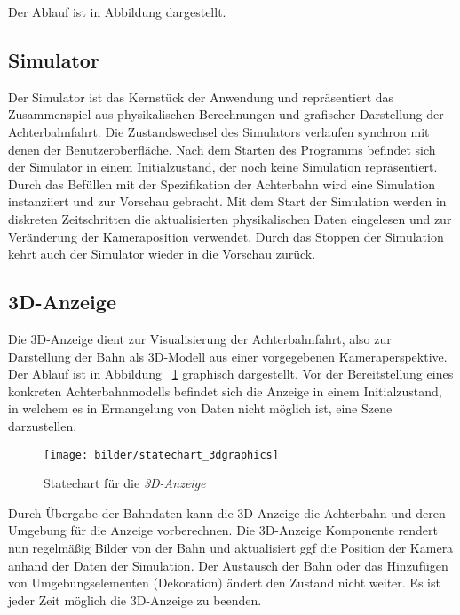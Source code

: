 Der Ablauf ist in Abbildung 
dargestellt.


\subsection{Simulator}
Der Simulator ist das Kernstück der Anwendung und repräsentiert das Zusammenspiel aus physikalischen Berechnungen
und grafischer Darstellung der Achterbahnfahrt. Die Zustandswechsel des Simulators verlaufen synchron mit 
denen der Benutzeroberfläche. Nach dem Starten des Programms befindet sich der Simulator in einem Initialzustand,
der noch keine Simulation repräsentiert. Durch das Befüllen mit der Spezifikation der Achterbahn wird
eine Simulation instanziiert und zur Vorschau gebracht. Mit dem Start der Simulation werden in diskreten Zeitschritten
die aktualisierten physikalischen Daten eingelesen und zur Veränderung der Kameraposition verwendet. Durch das
Stoppen der Simulation kehrt auch der Simulator wieder in die Vorschau zurück.

\newpage

\subsection{3D-Anzeige}
Die 3D-Anzeige dient zur Visualisierung der Achterbahnfahrt, also zur Darstellung der Bahn als 3D-Modell aus
einer vorgegebenen Kameraperspektive. Der Ablauf ist in Abbildung ~\ref{fig:statechart_3dgraphics} graphisch dargestellt. Vor der Bereitstellung eines konkreten Achterbahnmodells befindet sich
die Anzeige in einem Initialzustand, in welchem es in Ermangelung von Daten nicht möglich ist, eine Szene darzustellen. 

\begin{figure}
\texttt{[image: bilder/statechart\_3dgraphics]}
\caption{Statechart für die \textit{3D-Anzeige}}
\label{fig:statechart_3dgraphics}
\end{figure}

Durch Übergabe der Bahndaten kann die 3D-Anzeige die Achterbahn und deren Umgebung für die Anzeige vorberechnen.
Die 3D-Anzeige Komponente rendert nun regelmäßig Bilder von der Bahn und aktualisiert ggf die Position der Kamera anhand der Daten 
der Simulation. Der Austausch der Bahn oder das Hinzufügen von Umgebungselementen (Dekoration) ändert den Zustand nicht weiter.
Es ist jeder Zeit möglich die 3D-Anzeige zu beenden.

